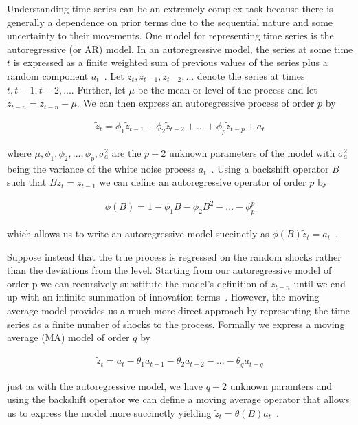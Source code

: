 \documentclass[oneside,12pt,openany]{book}
\begin{document}
	Understanding time series can be an extremely complex task because there is generally a dependence on prior terms due to the sequential nature and some uncertainty to their movements. One model for representing time series is the autoregressive (or AR) model. In an autoregressive model, the series at some time $t$ is expressed as a finite weighted sum of previous values of the series plus a random component $a_{t}$~\cite{Box}. Let $z_{t}, z_{t-1}, z_{t-2},...$ denote the series at times $t, t-1, t-2,...$. Further, let $\mu$ be the mean or level of the process and let $\tilde{z}_{t-n}=z_{t-n}-\mu$. We can then express an autoregressive process of order $p$ by
	
	\begin{align}
		\label{eqn:armodel}
		\tilde{z}_{t}=\phi_{1} \tilde{z}_{t-1}+\phi_{2} \tilde{z}_{t-2}+...+\phi_{p} \tilde{z}_{t-p}+a_{t}
	\end{align}
	
	\noindent where $\mu, \phi_{1}, \phi_{2}, ..., \phi_{p}, \sigma^{2}_{a}$ are the $p+2$ unknown parameters of the model with $\sigma^{2}_{a}$ being the variance of the white noise process $a_{t}$~\cite{Box}. Using a backshift operator $B$ such that $Bz_{t}=z_{t-1}$ we can define an autoregressive operator of order $p$ by
	
	\begin{align}
		\label{eqn:arop}
		\phi(B)=1-\phi_{1}B-\phi_{2}B^{2}-...-\phi_{p}^{p}
	\end{align}
	
	\noindent which allows us to write an autoregressive model succinctly as $\phi(B)\tilde{z}_{t}=a_{t}$~\cite{Box}.
	
	Suppose instead that the true process is regressed on the random shocks rather than the deviations from the level. Starting from our autoregressive model  of order p we can recursively substitute the model's definition of $\tilde{z}_{t-n}$ until we end up with an infinite summation of innovation terms~\cite{Box}. However, the moving average model provides us a much more direct approach by representing the time series as a finite number of shocks to the process. Formally we express a moving average (MA) model of order $q$ by
	
	\begin{align}
		\label{eqn:mamodel}
		\tilde{z}_{t}=a_{t}-\theta_{1}a_{t-1}-\theta_{2}a_{t-2}-...-\theta_{q}a_{t-q}
	\end{align}
	
	\noindent just as with the autoregressive model, we have $q+2$ unknown paramters and using the backshift operator we can define a moving average operator that allows us to express the model more succinctly yielding $\tilde{z}_{t}=\theta(B)a_{t}$~\cite{Box}.
	
\end{document}
